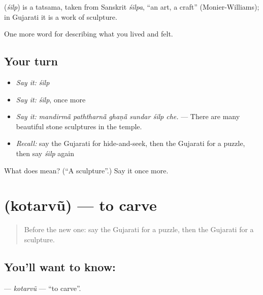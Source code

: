 \begin{cousinweb}
\textbf{} (\emph{śilp}) is a tatsama, taken from Sanskrit \emph{śilpa}, \textquotedblleft{}an art, a craft\textquotedblright{} (Monier-Williams); in Gujarati it is a work of sculpture.
\end{cousinweb}

\begin{grammarlens}[title={What you've built}]
One more word for describing what you lived and felt.
\end{grammarlens}

\subsection*{Your turn}
\begin{itemize}
\raggedright
  \item \emph{Say it:} \emph{śilp}
  \item \emph{Say it:} \emph{śilp}, once more
  \item \emph{Say it:} \emph{mandirmā̃ paththarnā̃ ghaṇā̃ sundar śilp che.} — There are many beautiful stone sculptures in the temple.
  \item \emph{Recall:} say the Gujarati for hide-and-seek, then the Gujarati for a puzzle, then say \emph{śilp} again
\end{itemize}

\begin{tcolorbox}[breakable,colback=teal!4,colframe=teal!35!black,title={Before you move on}]
What does  mean? (\textquotedblleft{}A sculpture\textquotedblright{}.) Say it once more.
\end{tcolorbox}
\section[\texorpdfstring{\gu{કોતરવું} (kotarvũ)}{કોતરવું (kotarvũ)}]{ (kotarvũ) — to carve}

\label{lesson:GU-C525-kotarvu}



\begin{quote}
Before the new one: say the Gujarati for a puzzle, then the Gujarati for a sculpture.
\end{quote}

\subsection*{You'll want to know: }
\textbf{} — \emph{kotarvũ} — \textquotedblleft{}to carve\textquotedblright{}.

